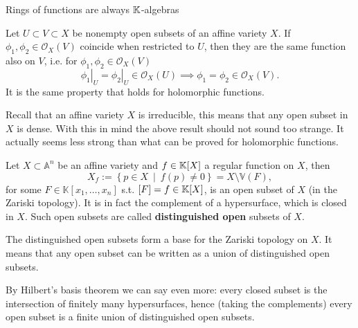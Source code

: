 \begin{rem}
	Rings of functions are always $\mathbb{K}$-algebras
\end{rem}

\begin{lem}
	Let $U \subset V \subset X$ be nonempty open subsets of an affine variety $X$.
	If $\phi_1, \phi_2 \in \mathcal{O}_X(V)$ coincide when restricted to $U$, then they are the same function also on $V$, i.e. for $\phi_1, \phi_2 \in \mathcal{O}_X(V)$
	\begin{equation}
		\left.\phi_1\right|_{U} = \left.\phi_2\right|_{U} \in \mathcal{O}_X(U) \implies \phi_1 = \phi_2 \in \mathcal{O}_X(V)
	.\end{equation} 
	It is the same property that holds for holomorphic functions.
\end{lem} 

\begin{rem}
	Recall that an affine variety $X$ is irreducible, this means that any open subset in $X$ is dense.
	With this in mind the above result should not sound too strange.
	It actually seems less strong than what can be proved for holomorphic functions.
\end{rem}

\begin{defn}
	Let $X \subset \mathbb{A}^n$ be an affine variety and $f \in \mathbb{K}[X]$ a regular function on $X$, then
	\begin{equation}
		X_f := \left\{ p \in X \ \middle|\ f(p) \neq 0 \right\} = X \setminus \mathbb{V}\left( F \right)
	,\end{equation} 
	for some $F \in \mathbb{K}\left[x_1, \ldots, x_n \right]$ s.t. $\left[ F \right] = f \in \mathbb{K}[X]$, is an open subset of $X$ (in the Zariski topology).
	It is in fact the complement of a hypersurface, which is closed in $X$.
	Such open subsets are called \textbf{distinguished open} subsets of $X$.
\end{defn}

\begin{rem}
	The distinguished open subsets form a base for the Zariski topology on $X$.
	It means that any open subset can be written as a union of distinguished open subsets.

	By Hilbert's basis theorem we can say even more: every closed subset is the intersection of finitely many hypersurfaces, hence (taking the complements) every open subset is a finite union of distinguished open subsets.
\end{rem}

